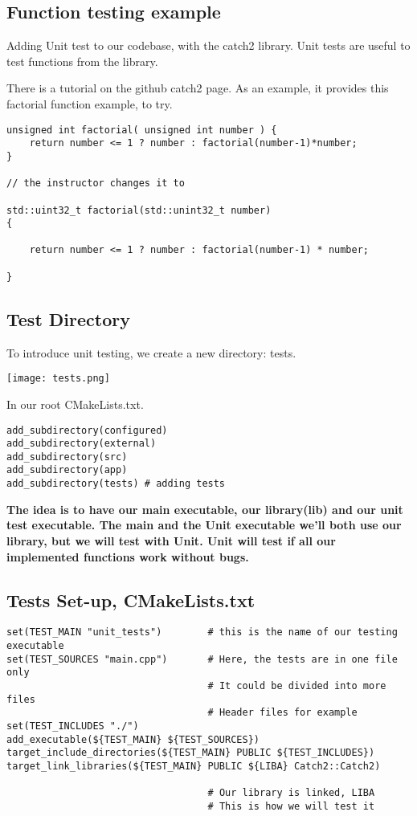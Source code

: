 \documentclass[openany]{report}
\begin{document}
\subsection{Function testing example}

Adding Unit test to our codebase, with the catch2 library. Unit tests are useful to test functions from the library.

There is a tutorial on the github catch2 page. As an example, it provides this factorial function example, to try.


\begin{verbatim}
unsigned int factorial( unsigned int number ) {
    return number <= 1 ? number : factorial(number-1)*number;
}

// the instructor changes it to

std::uint32_t factorial(std::unint32_t number)
{

    return number <= 1 ? number : factorial(number-1) * number;

}
\end{verbatim}


\subsection{Test Directory}

To introduce unit testing, we create a new directory: tests.

\begin{center}
    \texttt{[image: tests.png]}
\end{center}

In our root CMakeLists.txt.  

\begin{verbatim}
add_subdirectory(configured)
add_subdirectory(external)
add_subdirectory(src)
add_subdirectory(app)
add_subdirectory(tests) # adding tests
\end{verbatim}

\textbf{The idea is to have our main executable, our library(lib) and our unit test executable. The main and the Unit
executable we'll both use our library, but we will test with Unit. Unit will test if all our implemented functions work without bugs.}


\subsection{Tests Set-up, CMakeLists.txt}

\begin{verbatim}
set(TEST_MAIN "unit_tests")        # this is the name of our testing executable
set(TEST_SOURCES "main.cpp")       # Here, the tests are in one file only
                                   # It could be divided into more files
                                   # Header files for example
set(TEST_INCLUDES "./")
add_executable(${TEST_MAIN} ${TEST_SOURCES})
target_include_directories(${TEST_MAIN} PUBLIC ${TEST_INCLUDES})
target_link_libraries(${TEST_MAIN} PUBLIC ${LIBA} Catch2::Catch2)

                                   # Our library is linked, LIBA
                                   # This is how we will test it
\end{verbatim}
\end{document}
